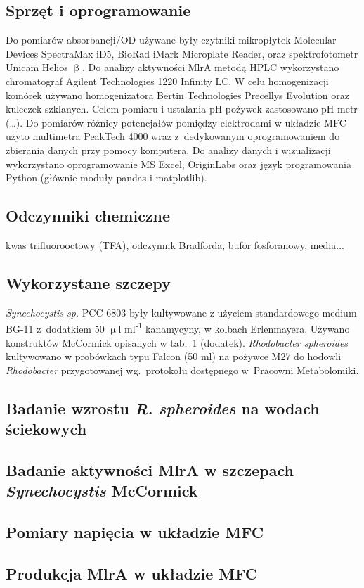 \subsection{Sprzęt i oprogramowanie}\label{subsec:sprzet}
Do pomiarów absorbancji/OD używane były czytniki mikropłytek
Molecular Devices SpectraMax iD5, BioRad iMark
Microplate Reader, oraz spektrofotometr Unicam Helios $\upbeta$.
Do analizy aktywności MlrA metodą HPLC wykorzystano chromatograf
Agilent Technologies 1220 Infinity LC\@.
W celu homogenizacji komórek używano homogenizatora
Bertin Technologies Precellys Evolution oraz kuleczek szklanych.
Celem pomiaru i ustalania pH pożywek zastosowano pH-metr (\ldots).
Do pomiarów różnicy potencjałów pomiędzy elektrodami
w układzie MFC użyto multimetra PeakTech 4000 wraz
z~dedykowanym oprogramowaniem do zbierania danych
przy pomocy komputera.
Do analizy danych i wizualizacji wykorzystano oprogramowanie
MS Excel, OriginLabs oraz język programowania Python
(głównie moduły pandas i matplotlib).

\subsection{Odczynniki chemiczne}\label{subsec:odczynniki}
kwas trifluorooctowy (TFA), odczynnik Bradforda, bufor fosforanowy,
media...

\subsection{Wykorzystane szczepy}\label{subsec:szczepy}
\textit{Synechocystis sp.} PCC 6803 były kultywowane z użyciem
standardowego medium BG-11 z~dodatkiem 50
$\upmu$l ml\textsuperscript{-1} kanamycyny, w kolbach Erlenmayera.
Używano konstruktów McCormick opisanych w tab.\ 1 (dodatek).
\textit{Rhodobacter spheroides} kultywowano w probówkach typu
Falcon (50 ml) na pożywce M27 do hodowli
\textit{Rhodobacter} przygotowanej wg.\ protokołu
dostępnego w~Pracowni Metabolomiki.

\subsection{Badanie wzrostu \textit{R. spheroides} na wodach ściekowych}\label{subsec:rhodobacter}

\subsection{Badanie aktywności MlrA w szczepach \textit{Synechocystis} McCormick}\label{subsec:mlra}

\subsection{Pomiary napięcia w układzie MFC}\label{subsec:volt}

\subsection{Produkcja MlrA w układzie MFC}\label{subsec:mfc}